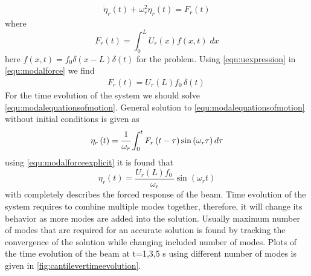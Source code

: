 \documentclass[]{report}
\begin{document}
\begin{align}
\ddot{\eta}_r\left(t\right)+\omega_r^2\eta_r\left(t\right)=F_r\left(t\right)\label{equ:modalequationsofmotion}
\end{align}
where 
\begin{equation}
F_r\left(t\right)=\int_{0}^{L}U_r\left(x\right)f\left(x,t\right)\;dx
\label{equ:modalforce}
\end{equation}
here $f\left(x,t\right)=f_0\delta\left(x-L\right)\delta\left(t\right)$ for the problem. Using \cref{equ:uexpression} in \cref{equ:modalforce} we find
\begin{equation}
\begin{split}
F_r\left(t\right)=U_r\left(L\right) f_{0}\, \delta\!\left(t\right)\,
\end{split}
\label{equ:modalforceexplicit}
\end{equation}
For the time evolution of the system we should solve \cref{equ:modalequationsofmotion}. General solution to \cref{equ:modalequationsofmotion} without initial conditions is given as
\begin{equation}
\eta_r\left(t\right)=\cfrac{1}{\omega_r}\int_{0}^{t} F_r\left(t-\tau\right)\sin\left(\omega_r\tau\right)d\tau
\end{equation}
using \cref{equ:modalforceexplicit} it is found that
\begin{equation}
\eta_r\left(t\right)=\frac{U_r\left(L\right) f_{0}\,}{\omega_r}\sin\left(\omega_r t\right)
\label{equ:etaexplicit}
\end{equation}
 with  completely describes the forced response of the beam. Time evolution of the system requires to combine multiple modes together, therefore, it will change its behavior as more modes are added into the solution. Usually maximum number of modes that are required for an accurate solution is found by tracking the convergence of the solution while changing included number of modes. Plots of the time evolution of the beam at t=1,3,5 s using different number of modes is given in \cref{fig:cantilevertimeevolution}.
\begin{figure}[ht!]

\end{figure}
\end{document}

